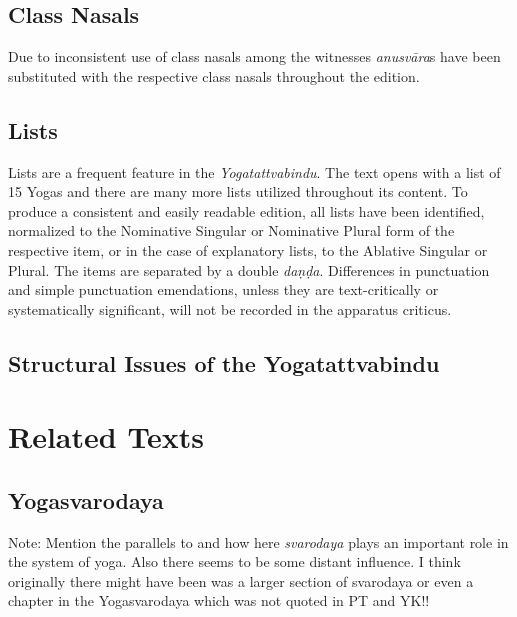 \section{Class Nasals}

Due to inconsistent use of class nasals among the witnesses \textit{anusvāra}s have been substituted with the respective class nasals throughout the edition.

\section{Lists}

Lists are a frequent feature in the \textit{Yogatattvabindu}. The text opens with a list of 15 Yogas and there are many more lists utilized throughout its content. To produce a consistent and easily readable edition, all lists have been identified, normalized to the Nominative Singular or Nominative Plural form of the respective item, or in the case of explanatory lists, to the Ablative Singular or Plural. The items are separated by a double \textit{daṇḍa}. Differences in punctuation and simple punctuation emendations, unless they are text-critically or systematically significant, will not be recorded in the apparatus criticus.
\clearpage

\section{Structural Issues of the Yogatattvabindu}
\label{structure}
\chapter{Related Texts}

\section{Yogasvarodaya}

Note: Mention the parallels to  and how here \textit{svarodaya} plays an important role in the system of yoga. Also there seems to be some distant influence. I think originally there might have been was a larger section of svarodaya or even a chapter in the Yogasvarodaya which was not quoted in PT and YK!! 

